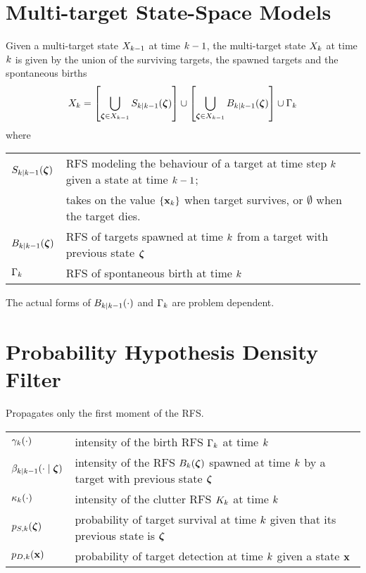 \documentclass[a4paper]{scrreprt}
\theoremstyle{theorem}
\theoremstyle{definition}
\begin{document}
\section{Multi-target State-Space Models}
Given a multi-target state \( X_{k-1} \) at time \( k-1 \), the multi-target state \( X_k \) at time \( k \) is given by the union of the surviving targets, the spawned targets and the spontaneous births
\begin{equation}\label{eq:multitarget_dynamics}
	\stRFS_\tind = \bqty{ \bigcup_{\vb{\zeta} \in \stRFS_{\tind-1}} S_{\tind|\tind-1}(\vb{\zeta}) } \cup \bqty{ \bigcup_{\vb{\zeta} \in \stRFS_{\tind-1}} B_{\tind|\tind-1}(\vb{\zeta}) } \cup \Gamma_\tind
\end{equation}
where
\begin{table}[h]
\centering
\begin{tabular}{@{} l l @{}}
	\toprule
	\( S_{\tind|\tind-1}(\vb{\zeta}) \)		& RFS modeling the behaviour of a target at time step \( k \) given a state at time \( k-1 \); \\
											& takes on the value \( \Bqty{\inVar_\tind} \) when target survives, or \( \emptyset \) when the target dies. \\
	\( B_{\tind|\tind-1}(\vb{\zeta}) \)		& RFS of targets spawned at time \( k \) from a target with previous state \( \vb{\zeta} \) \\
	\( \Gamma_k \)						& RFS of spontaneous birth at time \( k \) \\
	\bottomrule
\end{tabular}
\end{table}

The actual forms of \( B_{k|k-1}(\cdot) \) and \( \Gamma_k \) are problem dependent.



\section{Probability Hypothesis Density Filter}
Propagates only the first moment of the RFS.

\begin{table}[h]
\centering
\begin{tabular}{@{} l l @{}}
	\toprule
	\( \gamma_k(\cdot) \)								& intensity of the birth RFS \( \Gamma_k \) at time \( k \) \\
	\( \beta_{\tind|\tind-1}(\cdot \mid \vb{\zeta}) \) 		& intensity of the RFS \( B_\tind(\vb{\zeta}) \) spawned at time \( k \) by a target with previous state \( \vb{\zeta} \) \\
	\( \kappa_k(\cdot) \)								& intensity of the clutter RFS \( K_k \) at time \( k \) \\
	\( p_{S,k}(\vb{\zeta}) \)								& probability of target survival at time \( k \) given that its previous state is \( \vb{\zeta} \) \\
	\( p_{D,k}(\inVar) \)									& probability of target detection at time \( k \) given a state \( \inVar \) \\
	\bottomrule
\end{tabular}
\end{table}
\end{document}
